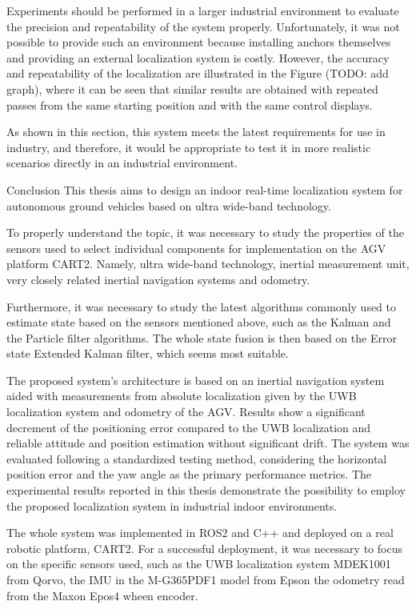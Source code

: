 	Experiments should be performed in a larger industrial environment to evaluate the precision and repeatability of the system properly. Unfortunately, it was not possible to provide such an environment because installing anchors themselves and providing an external localization system is costly. However, the accuracy and repeatability of the localization are illustrated in the Figure (TODO: add graph), where it can be seen that similar results are obtained with repeated passes from the same starting position and with the same control displays.
	
	As shown in this section, this system meets the latest requirements for use in industry, and therefore, it would be appropriate to test it in more realistic scenarios directly in an industrial environment.

\sec Conclusion
This thesis aims to design an indoor real-time localization system for autonomous ground vehicles based on ultra wide-band technology.

To properly understand the topic, it was necessary to study the properties of the sensors used to select individual components for implementation on the AGV platform CART2. Namely, ultra wide-band technology, inertial measurement unit, very closely related inertial navigation systems and odometry.

Furthermore, it was necessary to study the latest algorithms commonly used to estimate state based on the sensors mentioned above, such as the Kalman and the Particle filter algorithms. The whole state fusion is then based on the Error state Extended Kalman filter, which seems most suitable.

The proposed system's architecture is based on an inertial navigation system aided with measurements from absolute localization given by the UWB localization system and odometry of the AGV. Results show a significant decrement of the positioning error compared to the UWB localization and reliable attitude and position estimation without significant drift. The system was evaluated following a standardized testing method, considering the horizontal position error and the yaw angle as the primary performance metrics. The experimental results reported in this thesis demonstrate the possibility to employ the proposed localization system in industrial indoor environments.

The whole system was implemented in ROS2 and C++ and deployed on a real robotic platform, CART2. For a successful deployment, it was necessary to focus on the specific sensors used, such as the UWB localization system MDEK1001 from Qorvo, the IMU in the M-G365PDF1 model from Epson the odometry read from the Maxon Epos4 wheen encoder.

